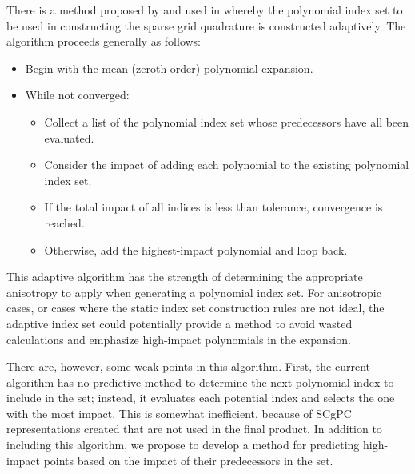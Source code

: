 There is a method proposed by \cite{Gerstner} and used in \cite{Ayres} whereby the polynomial index set to be
used in constructing the sparse grid quadrature is constructed adaptively.  The algorithm proceeds generally
as follows:
\begin{itemize}
  \item Begin with the mean (zeroth-order) polynomial expansion.
  \item While not converged:
    \begin{itemize}
      \item Collect a list of the polynomial index set whose predecessors have all been evaluated.
      \item Consider the impact of adding each polynomial to the existing polynomial index set.
      \item If the total impact of all indices is less than tolerance, convergence is reached.
      \item Otherwise, add the highest-impact polynomial and loop back.
    \end{itemize}
\end{itemize}
This adaptive algorithm has the strength of determining the appropriate anisotropy to apply when generating a
polynomial index set.  For anisotropic cases, or cases where the static index set construction rules are not
ideal, the adaptive index set could potentially provide a method to avoid wasted calculations and emphasize
high-impact polynomials in the expansion.

There are, however, some weak points in this algorithm.  First, the current algorithm has no predictive method
to determine the next polynomial index to include in the set; instead, it evaluates each potential index and
selects the one with the most impact.  This is somewhat inefficient, because of SCgPC representations created
that are not used in the final product.  In addition to including this algorithm, we propose to develop a
method for predicting high-impact points based on the impact of their predecessors in the set.

